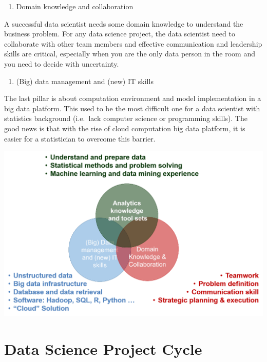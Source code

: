 \documentclass[12pt,]{krantz}
\providecommand{\tightlist}{%
  \setlength{\itemsep}{0pt}\setlength{\parskip}{0pt}}
\begin{document}
\begin{enumerate}
\def\labelenumi{(\arabic{enumi})}
\setcounter{enumi}{1}
\tightlist
\item
  Domain knowledge and collaboration
\end{enumerate}

A successful data scientist needs some domain knowledge to understand the business problem. For any data science project, the data scientist need to collaborate with other team members and effective communication and leadership skills are critical, especially when you are the only data person in the room and you need to decide with uncertainty.

\begin{enumerate}
\def\labelenumi{(\arabic{enumi})}
\setcounter{enumi}{2}
\tightlist
\item
  (Big) data management and (new) IT skills
\end{enumerate}

The last pillar is about computation environment and model implementation in a big data platform. This used to be the most difficult one for a data scientist with statistics background (i.e.~lack computer science or programming skills). The good news is that with the rise of cloud computation big data platform, it is easier for a statistician to overcome this barrier.

\includegraphics{images/softskill2.png}

\hypertarget{data-science-project-cycle}{%
\section{Data Science Project Cycle}\label{data-science-project-cycle}}
\end{document}
